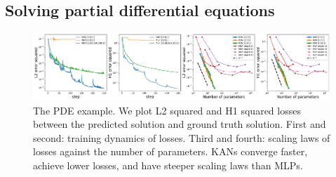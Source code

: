 \documentclass{article}
\numberwithin{equation}{section}
\numberwithin{figure}{section}
\begin{document}


\subsection{Solving partial differential equations}\label{subsec:pde}

\begin{figure}[t]
    \centering
    \includegraphics[width=1\linewidth]{./figs/PDE_results.pdf}
    \caption{The PDE example. We plot L2 squared and H1 squared losses between the predicted solution and ground truth solution. First and second: training dynamics of losses. Third and fourth: scaling laws of losses against the number of parameters. KANs converge faster, achieve lower losses, and have steeper scaling laws than MLPs.}
    \label{fig:PDE}
\end{figure}
\end{document}
